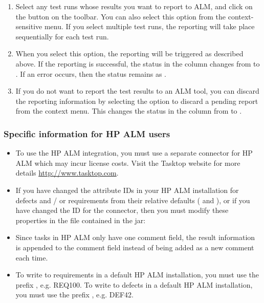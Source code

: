 \begin{enumerate}
\begin{description}
\end{description}
\item Select any test runs whose results you want to report to ALM, and click on the  button on the toolbar. You can also select this option from the context-sensitive menu. If you select multiple test runs, the reporting will take place sequentially for each test run. 
\item When you select this option, the reporting will be triggered as described above. If the reporting is successful, the status in the  column changes from  to . If an error occurs, then the status remains as . 
\item If you do not want to report the test results to an ALM tool, you can discard the reporting information by selecting the option to discard a pending report from the context menu. This changes the status in the  column  from  to .
\end{enumerate}


\subsubsection{Specific information for HP ALM users}
\begin{itemize}
\item To use the HP ALM integration, you must use a separate connector for HP ALM which may incur license costs. Visit the Tasktop website for more details \url{http://www.tasktop.com}.
\item If you have changed the attribute IDs in your HP ALM installation for defects and / or requirements from their relative defaults ( and ), or if you have changed the ID for the connector, then you must modify these properties in the  file contained in the jar:\\
\item Since tasks in HP ALM only have one comment field, the result information is appended to the comment field instead of being added as a new comment each time.
\item To write to requirements in a default HP ALM installation, you must use the prefix , e.g. REQ100. To write to defects in a default HP ALM installation, you must use the prefix , e.g. DEF42.
\end{itemize}


